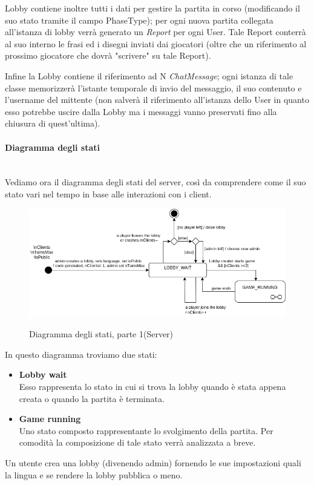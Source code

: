 \noindent Lobby contiene inoltre tutti i dati per gestire la partita in corso (modificando il suo stato tramite il campo PhaseType); per ogni nuova partita collegata all'istanza di lobby verrà generato un \emph{Report} per ogni User. Tale Report conterrà al suo interno le frasi ed i disegni inviati dai giocatori (oltre che un riferimento al prossimo giocatore che dovrà "scrivere" su tale Report).\newline

\noindent Infine la Lobby contiene il riferimento ad N \emph{ChatMessage}; ogni istanza di tale classe memorizzerà l'istante temporale di invio del messaggio, il suo contenuto e l'username del mittente (non salverà il riferimento all'istanza dello User in quanto esso potrebbe uscire dalla Lobby ma i messaggi vanno preservati fino alla chiusura di quest'ultima).

\paragraph{Diagramma degli stati}\mbox{}\\
Vediamo ora il diagramma degli stati del server, così da comprendere come il suo stato vari nel tempo in base alle interazioni con i client.

\begin{figure}[H]
    \caption{Diagramma degli stati, parte 1(Server)}
    \centering
    \includegraphics[width=150mm]{img/ingSoft/State Server.png}
    \label{fig:server_state}
\end{figure}

\noindent In questo diagramma troviamo due stati:
    \begin{itemize}
        \item {\textbf{Lobby wait}}\\
        Esso rappresenta lo stato in cui si trova la lobby quando è stata appena creata o quando la partita è terminata.
        \item {\textbf{Game running}}\\
        Uno stato composto rappresentante lo svolgimento della partita. Per comodità la composizione di tale stato verrà analizzata a breve.
    \end{itemize}
Un utente crea una lobby (divenendo admin) fornendo le sue impostazioni quali la lingua e se rendere la lobby pubblica o meno.\newline

